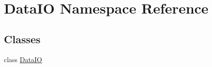 \hypertarget{namespace_data_i_o}{}\section{Data\+IO Namespace Reference}
\label{namespace_data_i_o}
\subsection*{Classes}
\begin{DoxyCompactItemize}
\item 
class \hyperlink{class_data_i_o_1_1_data_i_o}{Data\+IO}
\end{DoxyCompactItemize}
